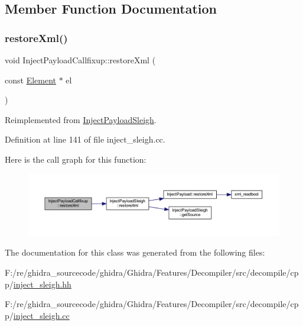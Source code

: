 \subsection{Member Function Documentation}
\mbox{\label{class_inject_payload_callfixup_a79e5f333168b25b8cd91e18e809029eb}} 
\subsubsection{\texorpdfstring{restoreXml()}{restoreXml()}}
{\footnotesize\ttfamily void Inject\+Payload\+Callfixup\+::restore\+Xml (\begin{DoxyParamCaption}\item[{const \mbox{\hyperlink{class_element}{Element}} $\ast$}]{el }\end{DoxyParamCaption})\hspace{0.3cm}{\ttfamily [virtual]}}



Reimplemented from \mbox{\hyperlink{class_inject_payload_sleigh_ae41de3f330c3cbb5327e94fcf3ae705c}{Inject\+Payload\+Sleigh}}.



Definition at line 141 of file inject\+\_\+sleigh.\+cc.

Here is the call graph for this function\+:
\nopagebreak
\begin{figure}[H]
\begin{center}
\leavevmode
\includegraphics[width=350pt]{class_inject_payload_callfixup_a79e5f333168b25b8cd91e18e809029eb_cgraph}
\end{center}
\end{figure}


The documentation for this class was generated from the following files\+:\begin{DoxyCompactItemize}
\item 
F\+:/re/ghidra\+\_\+sourcecode/ghidra/\+Ghidra/\+Features/\+Decompiler/src/decompile/cpp/\mbox{\hyperlink{inject__sleigh_8hh}{inject\+\_\+sleigh.\+hh}}\item 
F\+:/re/ghidra\+\_\+sourcecode/ghidra/\+Ghidra/\+Features/\+Decompiler/src/decompile/cpp/\mbox{\hyperlink{inject__sleigh_8cc}{inject\+\_\+sleigh.\+cc}}\end{DoxyCompactItemize}
